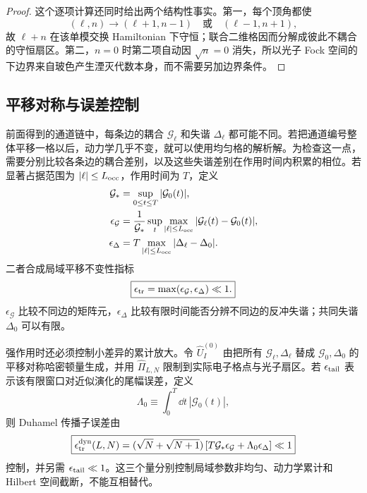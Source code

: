 \begin{proof}
这个逐项计算还同时给出两个结构性事实。第一，每个顶角都使
\[
 (\ell,n)\longrightarrow(\ell+1,n-1)
 \quad\text{或}\quad
 (\ell-1,n+1),
\]
故 $\ell+n$ 在该单模交换 Hamiltonian 下守恒；联合二维格因而分解成彼此不耦合的守恒扇区。第二，$n=0$ 时第二项自动因 $\sqrt n=0$ 消失，所以光子 Fock 空间的下边界来自玻色产生湮灭代数本身，而不需要另加边界条件。
\end{proof}


\subsection{平移对称与误差控制}

前面得到的通道链中，每条边的耦合 $\mathcal G_\ell$ 和失谐 $\Delta_\ell$ 都可能不同。若把通道编号整体平移一格以后，动力学几乎不变，就可以使用均匀格的解析解。为检查这一点，需要分别比较各条边的耦合差别，以及这些失谐差别在作用时间内积累的相位。若显著占据范围为 $|\ell|\le L_{\rm occ}$，作用时间为 $T$，定义
\begin{align*}
\mathcal G_*&=\sup_{0\le t\le T}|\mathcal G_0(t)|,\\
\epsilon_{\mathcal G}
&=\frac1{\mathcal G_*}
\sup_t\max_{|\ell|\le L_{\rm occ}}|\mathcal G_\ell(t)-\mathcal G_0(t)|,\\
\epsilon_\Delta
&=T\max_{|\ell|\le L_{\rm occ}}|\Delta_\ell-\Delta_0|.
\end{align*}
二者合成局域平移不变性指标
\begin{equation}
\boxed{
\epsilon_{\rm tr}=\max(\epsilon_{\mathcal G},\epsilon_\Delta)\ll1.}
\label{eq:master_translation_invariance_conditions}
\end{equation}
$\epsilon_{\mathcal G}$ 比较不同边的矩阵元，$\epsilon_\Delta$ 比较有限时间能否分辨不同边的反冲失谐；共同失谐 $\Delta_0$ 可以有限。

强作用时还必须控制小差异的累计放大。令 $\hat U_I^{(0)}$ 由把所有 $\mathcal G_\ell,\Delta_\ell$ 替成 $\mathcal G_0,\Delta_0$ 的平移对称哈密顿量生成，并用 $\hat\Pi_{L,N}$ 限制到实际电子格点与光子扇区。若 $\epsilon_{\rm tail}$ 表示该有限窗口对近似演化的尾幅误差，定义
\begin{equation*}
\Lambda_0\equiv\int_0^T\dd t\,|\mathcal G_0(t)|,
\end{equation*}
则 Duhamel 传播子误差由
\begin{equation}
\boxed{
\epsilon_{\rm tr}^{\rm dyn}(L,N)
=(\sqrt N+\sqrt{N+1})
\left[T\mathcal G_*\epsilon_{\mathcal G}+\Lambda_0\epsilon_\Delta\right]\ll1}
\label{eq:translation_invariance_duhamel_error}
\end{equation}
控制，并另需 $\epsilon_{\rm tail}\ll1$。这三个量分别控制局域参数非均匀、动力学累计和 Hilbert 空间截断，不能互相替代。

